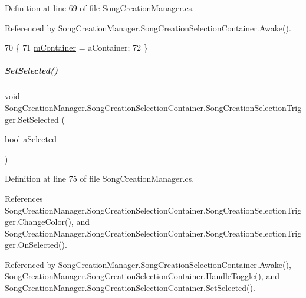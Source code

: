 Definition at line 69 of file Song\+Creation\+Manager.\+cs.



Referenced by Song\+Creation\+Manager.\+Song\+Creation\+Selection\+Container.\+Awake().


\begin{DoxyCode}
70             \{
71                 \hyperlink{group___s_c_m_nest_class_aae8ebcbfe18ad8706d11edac54f2da87}{mContainer} = aContainer;
72             \}
\end{DoxyCode}
\mbox{\label{group___s_c_m_nest_class_a0d65cd109a370034f580d63e823725b9}} 
\subparagraph{\texorpdfstring{Set\+Selected()}{SetSelected()}}
{\footnotesize\ttfamily void Song\+Creation\+Manager.\+Song\+Creation\+Selection\+Container.\+Song\+Creation\+Selection\+Trigger.\+Set\+Selected (\begin{DoxyParamCaption}\item[{bool}]{a\+Selected }\end{DoxyParamCaption})}



Definition at line 75 of file Song\+Creation\+Manager.\+cs.



References Song\+Creation\+Manager.\+Song\+Creation\+Selection\+Container.\+Song\+Creation\+Selection\+Trigger.\+Change\+Color(), and Song\+Creation\+Manager.\+Song\+Creation\+Selection\+Container.\+Song\+Creation\+Selection\+Trigger.\+On\+Selected().



Referenced by Song\+Creation\+Manager.\+Song\+Creation\+Selection\+Container.\+Awake(), Song\+Creation\+Manager.\+Song\+Creation\+Selection\+Container.\+Handle\+Toggle(), and Song\+Creation\+Manager.\+Song\+Creation\+Selection\+Container.\+Set\+Selected().


